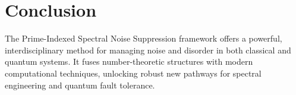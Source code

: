 \documentclass{article}
\theoremstyle{plain}
\begin{document}
\section{Conclusion}
The Prime-Indexed Spectral Noise Suppression framework offers a powerful, interdisciplinary method for managing noise and disorder in both classical and quantum systems. It fuses number-theoretic structures with modern computational techniques, unlocking robust new pathways for spectral engineering and quantum fault tolerance.

\nocite{*}


\end{document}
